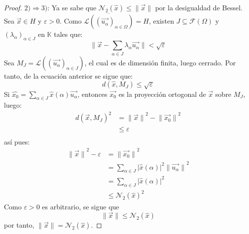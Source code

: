 \documentclass[12pt]{report}
\theoremstyle{largebreak}
\newcommand\abs[1]{\ensuremath{\big|#1\big|}}
\newcommand\norm[1]{\ensuremath{\|#1\|}}
\newcommand{\N}[2]{\ensuremath{\mathcal{N}_{#1}\left(#2\right)}}
\begin{document}
\begin{proof}
        $2)\Rightarrow 3)$: Ya se sabe que $\N{2}{\hat{x}}\leq\norm{\vec{x}}$ por la desigualdad de Bessel.
        Sea $\vec{x}\in H$ y $\varepsilon>0$. Como $\overline{\mathcal{L}\left(\left(\vec{u_\alpha} \right)_{\alpha\in\Omega}\right)}= H$, existen $J\subseteq \mathcal{F}(\Omega)$ y $\left(\lambda_\alpha \right)_{\alpha\in J }$ en $\mathbb{K}$ tales que:
        \begin{equation}
            \norm{\vec{x}-\sum_{\alpha\in J }\lambda_\alpha\vec{u_\alpha}}<\sqrt{\varepsilon}
        \end{equation}
        Sea $M_J=\mathcal{L}\left(\left(\vec{u_\alpha} \right)_{ \alpha\in J} \right)$, el cual es de dimensión finita, luego cerrado. Por tanto, de la ecuación anterior se sigue que:
        \begin{equation*}
            d(\hat{x},M_J)\leq\sqrt{\varepsilon}
        \end{equation*}
        Si $\hat{x_0}=\sum_{\alpha\in J}\hat{x}(\alpha)\vec{u_\alpha}$, entonces $\vec{x_0}$ es la proyección ortogonal de $\vec{x}$ sobre $M_J$, luego:
        \begin{equation*}
            \begin{split}
                d(\vec{x},M_J)^2&=\norm{\vec{x}}^2-\norm{\vec{x_0}}^2\\
                &\leq\varepsilon\\
            \end{split}
        \end{equation*}
        así pues:
        \begin{equation*}
            \begin{split}
                \norm{\vec{x}}^2-\varepsilon&=\norm{\vec{x_0}}^2 \\
                &=\sum_{\alpha\in J}\abs{\hat{x}(\alpha)}^2\norm{\vec{u_\alpha}}^2\\
                &=\sum_{\alpha\in J}\abs{\hat{x}(\alpha)}^2\\
                &\leq\N{2}{\hat{x}}^2
            \end{split}
        \end{equation*}
        Como $\varepsilon>0$ es arbitrario, se sigue que
        \begin{equation*}
            \norm{\vec{x}}\leq\N{2}{\hat{x}}
        \end{equation*}
        por tanto, $\norm{\vec{x}}=\N{2}{\hat{x}}$.


\end{proof}
\end{document}
